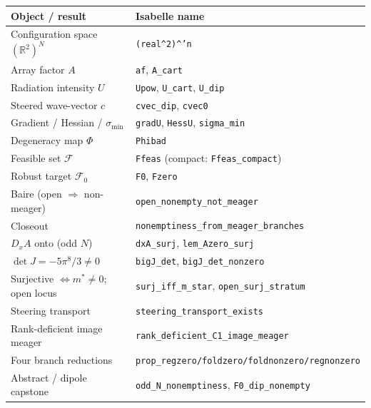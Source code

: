 \documentclass[11pt]{article}
\theoremstyle{plain}
\theoremstyle{definition}
\theoremstyle{remark}
\newcommand{\RR}{\mathbb{R}}
\newcommand{\cvec}{c}                 %
\newcommand{\Af}{A}                   %
\newcommand{\Upat}{U}                 %
\newcommand{\Ffeas}{\mathcal{F}}      %
\newcommand{\Fzero}{\mathcal{F}_{0}}  %
\newcommand{\sigmin}{\sigma_{\min}}
\newcommand{\code}[1]{\texttt{\small #1}}
\begin{document}
\begin{center}\small
\begin{tabular}{@{}ll@{}}
\hline
\textbf{Object / result} & \textbf{Isabelle name} \\
\hline
Configuration space $(\RR^2)^N$ & \code{(real\^{}2)\^{}'n} \\
Array factor $\Af$ & \code{af}, \code{A\_cart} \\
Radiation intensity $\Upat$ & \code{Upow}, \code{U\_cart}, \code{U\_dip} \\
Steered wave-vector $\cvec$ & \code{cvec\_dip}, \code{cvec0} \\
Gradient / Hessian / $\sigmin$ & \code{gradU}, \code{HessU}, \code{sigma\_min} \\
Degeneracy map $\Phi$ & \code{Phibad} \\
Feasible set $\Ffeas$ & \code{Ffeas} (compact: \code{Ffeas\_compact}) \\
Robust target $\Fzero$ & \code{F0}, \code{Fzero} \\
Baire (open $\Rightarrow$ non-meager) & \code{open\_nonempty\_not\_meager} \\
Closeout & \code{nonemptiness\_from\_meager\_branches} \\
$D_x\Af$ onto (odd $N$) & \code{dxA\_surj}, \code{lem\_Azero\_surj} \\
$\det J=-5\pi^8/3\ne0$ & \code{bigJ\_det}, \code{bigJ\_det\_nonzero} \\
Surjective $\Leftrightarrow m^\ast\ne0$; open locus & \code{surj\_iff\_m\_star}, \code{open\_surj\_stratum} \\
Steering transport & \code{steering\_transport\_exists} \\
Rank-deficient image meager & \code{rank\_deficient\_C1\_image\_meager} \\
Four branch reductions & \code{prop\_regzero/foldzero/foldnonzero/regnonzero} \\
Abstract / dipole capstone & \code{odd\_N\_nonemptiness}, \code{F0\_dip\_nonempty} \\
\hline
\end{tabular}
\end{center}
\end{document}
